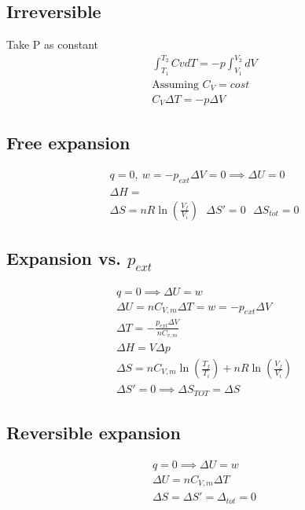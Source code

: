 \documentclass[Master.tex]{subfiles}
\begin{document}
\begin{multicols}{2}
		  \subsection{Irreversible}
				   Take P as constant
				   \begin{gather*}
						    \int _{T_1}^{T_2} CvdT = -p \int _{V_1}^{V_2}dV\\
						    \text{Assuming } C_{V}= cost\\
						    C_{V}\Delta T = -p \Delta V
				   \end{gather*}

		  \subsection{Free expansion}

				   \begin{gather*}
						    q = 0, ~ w = -p_{ext} \Delta V = 0 \implies \Delta U = 0 \\
						    \Delta H = \\
						    \Delta S = nR\ln (\frac{V_f}{V_i}) ~ ~ ~ \Delta S' = 0 ~ ~ ~ \Delta S_{tot} = 0
				   \end{gather*}
		  \subsection{Expansion vs. $p_{ext}$}
				   \begin{gather*}
						    q = 0 \implies \Delta U = w \\
						    \Delta U = nC_{V,m} \Delta T = w = -p_{ext} \Delta V \\
						    \Delta T = -\frac{p_{ext}\Delta V}{nC_{v,m}}  \\
						    \Delta H = V \Delta p \\
						    \Delta S = nC_{V,m} \ln (\frac{T_{f}}{T_{i}}) + nR\ln (\frac{V_f}{V_{i}})\\
						    \Delta S' = 0 \implies \Delta S_{TOT}= \Delta S
				   \end{gather*}
		  \subsection{Reversible expansion}
				   \begin{gather*}
						    q = 0 \implies \Delta U = w \\
						    \Delta U = nC_{V,m} \Delta T\\
						    \Delta S = \Delta S' = \Delta _{tot} = 0
				   \end{gather*}

\end{multicols}
\end{document}

